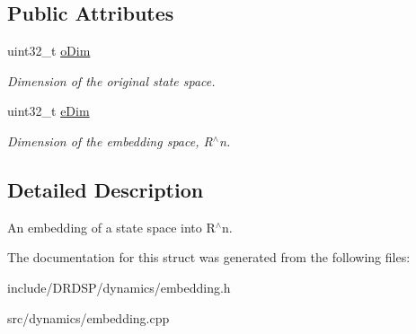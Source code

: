 \subsection*{Public Attributes}
\begin{DoxyCompactItemize}
\item 
\hypertarget{struct_d_r_d_s_p_1_1_embedding_ac49e8aa042fbf2ee8e9fdc3d2b4f1c26}{uint32\-\_\-t \hyperlink{struct_d_r_d_s_p_1_1_embedding_ac49e8aa042fbf2ee8e9fdc3d2b4f1c26}{o\-Dim}}\label{struct_d_r_d_s_p_1_1_embedding_ac49e8aa042fbf2ee8e9fdc3d2b4f1c26}

\begin{DoxyCompactList}\small\item\em Dimension of the original state space. \end{DoxyCompactList}\item 
\hypertarget{struct_d_r_d_s_p_1_1_embedding_aa49b8deb5d403025ca5db3f483c015b2}{uint32\-\_\-t \hyperlink{struct_d_r_d_s_p_1_1_embedding_aa49b8deb5d403025ca5db3f483c015b2}{e\-Dim}}\label{struct_d_r_d_s_p_1_1_embedding_aa49b8deb5d403025ca5db3f483c015b2}

\begin{DoxyCompactList}\small\item\em Dimension of the embedding space, R$^\wedge$n. \end{DoxyCompactList}\end{DoxyCompactItemize}


\subsection{Detailed Description}
An embedding of a state space into R$^\wedge$n. 

The documentation for this struct was generated from the following files\-:\begin{DoxyCompactItemize}
\item 
include/\-D\-R\-D\-S\-P/dynamics/embedding.\-h\item 
src/dynamics/embedding.\-cpp\end{DoxyCompactItemize}
